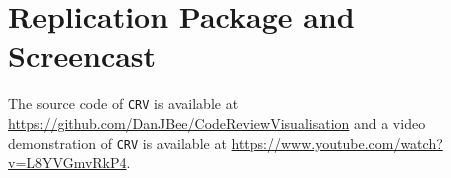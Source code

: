 \documentclass[sigconf]{acmart}
\newcommand{\service}{{\tt CRV}\xspace}
\begin{document}
\section{Replication Package and Screencast}
The source code of \service is available at \url{https://github.com/DanJBee/CodeReviewVisualisation} and a video demonstration of \service is available at \url{https://www.youtube.com/watch?v=L8YVGmvRkP4}.



\end{document}

